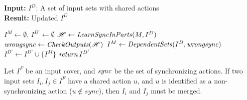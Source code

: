 \begin{algorithm}[thb]
		\small
		\caption{Check Input Sets with Shared Actions}
		\label{alg:learnsync}
        \hspace*{\algorithmicindent}
		\textbf{Input:}  $I^D$:   A set of input sets with shared actions  \\
  \hspace*{\algorithmicindent}
        \textbf{Result:}  Updated $I^D$ 
		\begin{algorithmic}[1]
			\State $I^M\leftarrow \emptyset,\, I^{D'}\leftarrow\emptyset$ 
            \State $\mathscr{H}\leftarrow {
            \it LearnSyncInParts} (M,I^D)$ \label{algline3:learnsyncinpart}
            \State ${\it wrongsync}\leftarrow {\it CheckOutputs}(\mathscr{H})$ \label{algline3:checkoutput}
             \label{algline3:Ifwrongsync}
             \label{algline3:forwrongsync}
            \State $I^{M}\leftarrow {\it DependentSets}(I^D,{\it wrongsync})$ \label{algline3:dependentset}
            \State $I^{D'}\leftarrow I^{D'} \cup \{I^M\}$ \label{algline3:updateID}
            \EndFor
            \EndIf
            \State ${\it return}\, I^{D'}$
            \label{algline3:return}
            \label{alg:leransyncset}
			\EndFunction			
		\end{algorithmic}
	\end{algorithm}
 

	
	
	



\begin{proposition}\label{pro:setmerged}
	Let $I^F$ be an input cover, and $\it sync$ be the set of synchronizing actions. If two input sets $I_i,I_j\in I^F$ have a shared action $u$, and $u$ is identified as a non-synchronizing action  ($u \notin sync$), then %
 $I_i$ and $I_j$ must be merged.
\end{proposition}

